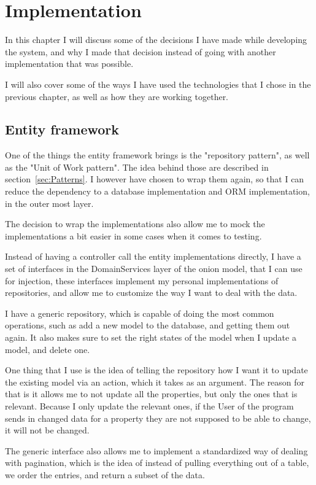 \chapter{Implementation}
\label{chap:Implementation}

In this chapter I will discuss some of the decisions I have made while developing the system, and why I made that decision instead of going with another implementation that was possible.

I will also cover some of the ways I have used the technologies that I chose in the previous chapter, as well as how they are working together.

\section{Entity framework}
\label{sec:Entity framework}
One of the things the entity framework brings is the "repository pattern", as well as the "Unit of Work pattern". The idea behind those are described in section~\ref{sec:Patterns}. I however have chosen to wrap them again, so that I can reduce the dependency to a database implementation and ORM implementation, in the outer most layer.

The decision to wrap the implementations also allow me to mock the implementations a bit easier in some cases when it comes to testing.

Instead of having a controller call the entity implementations directly, I have a set of interfaces in the DomainServices layer of the onion model, that I can use for injection, these interfaces implement my personal implementations of repositories, and allow me to customize the way I want to deal with the data.

I have a generic repository, which is capable of doing the most common operations, such as add a new model to the database, and getting them out again. It also makes sure to set the right states of the model when I update a model, and delete one.

One thing that I use is the idea of telling the repository how I want it to update the existing model via an action, which it takes as an argument. The reason for that is it allows me to not update all the properties, but only the ones that is relevant. Because I only update the relevant ones, if the User of the program sends in changed data for a property they are not supposed to be able to change, it will not be changed.

The generic interface also allows me to implement a standardized way of dealing with pagination, which is the idea of instead of pulling everything out of a table, we order the entries, and return a subset of the data.

